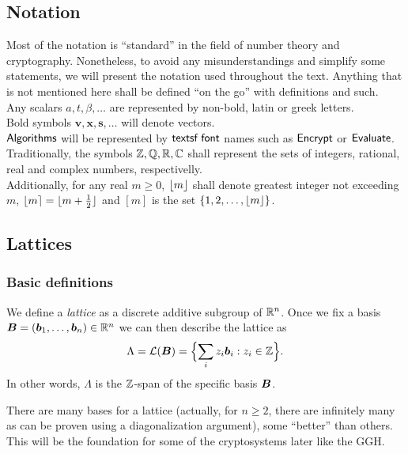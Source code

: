\subsection{Notation}
Most of the notation is ``standard'' in the field of number theory and cryptography. Nonetheless, to avoid any misunderstandings and simplify some statements, we will present the notation used throughout the text. Anything that is not mentioned here shall be defined ``on the go'' with definitions and such. \\

\noindent Any scalars $a, t, \beta, \dots$ are represented by non-bold, latin or greek letters.\\
Bold symbols $\bm{v}, \bm{x}, \bm{s}, \dots$ will denote vectors. \\
$\textsf{Algorithms}$ will be represented by $\textsf{textsf font}$ names such as $\textsf{Encrypt}$ or $\textsf{Evaluate}$.\\
Traditionally, the symbols $\mathbb{Z}, \mathbb{Q}, \mathbb{R}, \mathbb{C}$ shall represent the sets of integers, rational, real and complex numbers, respectivelly.\\
Additionally, for any real $m \geq 0$, $\lfloor m \rfloor$ shall denote greatest integer not exceeding $m$, $\lfloor m \rceil = \lfloor m + \frac{1}{2} \rfloor$ and $[m]$ is the set $\{1, 2, \dots, \lfloor m \rfloor\}$.\\

\subsection{Lattices}
\subsubsection*{Basic definitions}
We define a \textit{lattice} as a discrete additive subgroup of $\mathbb{R}^n$. Once we fix a basis $\boldsymbol{B} = (\boldsymbol{b}_1, \dots ,\boldsymbol{b}_n) \in \mathbb{R}^n$ we can then describe the lattice as
\[ \Lambda = \mathcal{L}(\boldsymbol{B}) = \Bigl\{ \sum_i z_i \boldsymbol{b}_i : z_i \in \mathbb{Z} \Bigl\}.\]
In other words, $\Lambda$ is the $\mathbb{Z}$-span of the specific basis $\boldsymbol{B}$.

There are many bases for a lattice (actually, for $n \geq 2$, there are infinitely many as can be proven using a diagonalization argument), some ``better'' than others. This will be the foundation for some of the cryptosystems later like the GGH.

